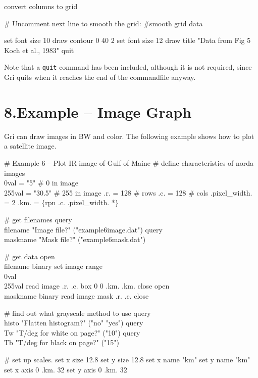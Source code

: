 convert columns to grid 

\# Uncomment next line to smooth the grid:
\#smooth grid data

set font size 10
draw contour 0 40 2
set font size 12
draw title "Data from Fig 5 Koch et al., 1983"
quit
\endexample

Note that a {\tt quit} command has been included, although it is not
required, since Gri quits when it reaches the end of the commandfile
anyway.




\section{8.\quad Example -- Image Graph} Gri can draw images in BW and color.
The following example shows how to plot a satellite image.


\beginexample
\# Example 6 -- Plot IR image of Gulf of Maine
\# define characteristics of norda images
\\0val         = "5"             \# 0 in image
\\255val       = "30.5"          \# 255 in image
.r.           = 128             \# rows
.c.           = 128             \# cols
.pixel_width. = 2
.km.          = $\lbrace$rpn .c. .pixel_width. *$\rbrace$

\# get filenames
query \\filename "Image file?" ("example6image.dat")
query \\maskname "Mask  file?" ("example6mask.dat")

\# get data
open \\filename binary
set image range \\0val \\255val
read image .r. .c. box 0 0 .km. .km.
close
open \\maskname binary
read image mask .r. .c.
close

\# find out what grayscale method to use
query \\histo "Flatten histogram?"       ("no" "yes")
query \\Tw    "T/deg for white on page?" ("10")
query \\Tb    "T/deg for black on page?" ("15")

\# set up scales. 
set x size 12.8
set y size 12.8
set x name "km"
set y name "km"
set x axis 0 .km. 32
set y axis 0 .km. 32

